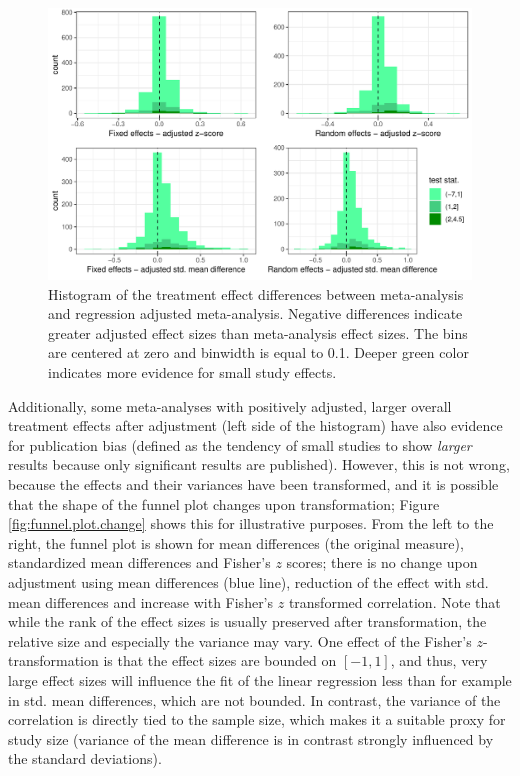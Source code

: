 \documentclass[11pt,a4paper,twoside]{book}\usepackage[]{graphicx}\usepackage[]{color}
\newenvironment{knitrout}{}{} %
\begin{document}
\begin{figure}
\begin{knitrout}
\color{fgcolor}

{\centering \includegraphics[width=\textwidth-3cm]{figure/ch03_figunnamed-chunk-20-1} 

}



\end{knitrout}
\caption{Histogram of the treatment effect differences between meta-analysis and regression adjusted meta-analysis. Negative differences indicate greater adjusted effect sizes than meta-analysis effect sizes. The bins are centered at zero and binwidth is equal to 0.1. Deeper green color indicates more evidence for small study effects.}
\label{fig:adjustment.reg}
\end{figure}

Additionally, some meta-analyses with positively adjusted, larger overall treatment effects after adjustment (left side of the histogram) have also evidence for publication bias (defined as the tendency of small studies to show \textit{larger} results because only significant results are published). However, this is not wrong, because the effects and their variances have been transformed, and it is possible that the shape of the funnel plot changes upon transformation; Figure \ref{fig:funnel.plot.change} shows this for illustrative purposes. From the left to the right, the funnel plot is shown for mean differences (the original measure), standardized mean differences and Fisher's $z$ scores; there is no change upon adjustment using mean differences (blue line), reduction of the effect with std. mean differences and increase with Fisher's $z$ transformed correlation. Note that while the rank of the effect sizes is usually preserved after transformation, the relative size and especially the variance may vary. One effect of the Fisher's $z$-transformation is that the effect sizes are bounded on $[-1,1]$, and thus, very large effect sizes will influence the fit of the linear regression less than for example in std. mean differences, which are not bounded. In contrast, the variance of the correlation is directly tied to the sample size, which makes it a suitable proxy for study size (variance of the mean difference is in contrast strongly influenced by the standard deviations).
\end{document}
